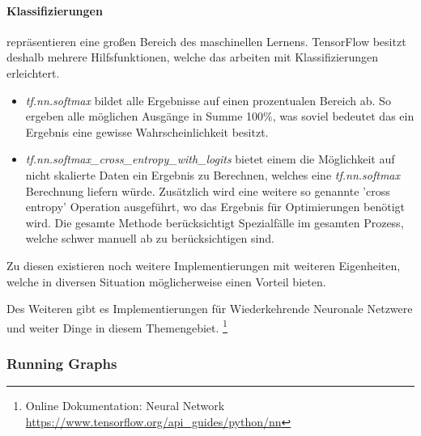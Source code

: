 \paragraph{Klassifizierungen} repräsentieren eine großen Bereich des maschinellen Lernens. 
TensorFlow besitzt deshalb mehrere Hilfsfunktionen, welche das arbeiten mit Klassifizierungen erleichtert. 
\begin{itemize}
	\item \textit{tf.nn.softmax} bildet alle Ergebnisse auf einen prozentualen Bereich ab. 
	So ergeben alle möglichen Ausgänge in Summe 100\%, was soviel bedeutet das ein Ergebnis eine gewisse Wahrscheinlichkeit besitzt. 
	\item \textit{tf.nn.softmax\_cross\_entropy\_with\_logits} bietet einem die Möglichkeit auf nicht skalierte Daten ein Ergebnis zu Berechnen, welches eine \textit{tf.nn.softmax} Berechnung liefern würde. 
	Zusätzlich wird eine weitere so genannte 'cross entropy' Operation ausgeführt, wo das Ergebnis für Optimierungen benötigt wird. 
	Die gesamte Methode berücksichtigt Spezialfälle im gesamten Prozess, welche schwer manuell ab zu berücksichtigen sind. 
\end{itemize}
\phantom \newline

\noindent
Zu diesen existieren noch weitere Implementierungen mit weiteren Eigenheiten, welche in diversen Situation möglicherweise einen Vorteil bieten. 


\noindent
Des Weiteren gibt es Implementierungen für Wiederkehrende Neuronale Netzwere und weiter Dinge in diesem Themengebiet. 
\footnote{Online Dokumentation: Neural Network \url{https://www.tensorflow.org/api_guides/python/nn}}

\subsubsection{Running Graphs}

